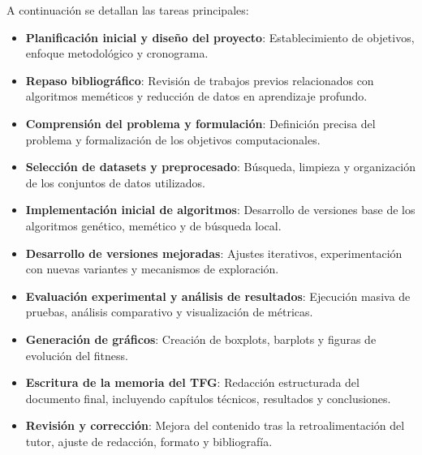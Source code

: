 A continuación se detallan las tareas principales:
\begin{itemize}
    \item \textbf{Planificación inicial y diseño del proyecto}: Establecimiento de objetivos, enfoque metodológico y cronograma.
    \item \textbf{Repaso bibliográfico}: Revisión de trabajos previos relacionados con algoritmos meméticos y reducción de datos en aprendizaje profundo.
    \item \textbf{Comprensión del problema y formulación}: Definición precisa del problema y formalización de los objetivos computacionales.
    \item \textbf{Selección de datasets y preprocesado}: Búsqueda, limpieza y organización de los conjuntos de datos utilizados.
    \item \textbf{Implementación inicial de algoritmos}: Desarrollo de versiones base de los algoritmos genético, memético y de búsqueda local.
    \item \textbf{Desarrollo de versiones mejoradas}: Ajustes iterativos, experimentación con nuevas variantes y mecanismos de exploración.
    \item \textbf{Evaluación experimental y análisis de resultados}: Ejecución masiva de pruebas, análisis comparativo y visualización de métricas.
    \item \textbf{Generación de gráficos}: Creación de boxplots, barplots y figuras de evolución del fitness.
    \item \textbf{Escritura de la memoria del TFG}: Redacción estructurada del documento final, incluyendo capítulos técnicos, resultados y conclusiones.
    \item \textbf{Revisión y corrección}: Mejora del contenido tras la retroalimentación del tutor, ajuste de redacción, formato y bibliografía.
\end{itemize}


